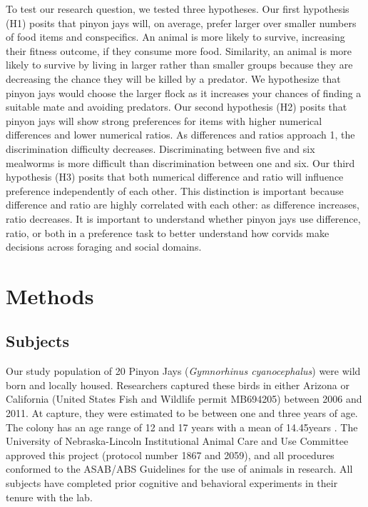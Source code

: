 \documentclass[
  ,doc,floatsintext]{apa6}
\begin{document}
To test our research question, we tested three hypotheses. Our first hypothesis (H1) posits that pinyon jays will, on average, prefer larger over smaller numbers of food items and conspecifics. An animal is more likely to survive, increasing their fitness outcome, if they consume more food. Similarity, an animal is more likely to survive by living in larger rather than smaller groups because they are decreasing the chance they will be killed by a predator. We hypothesize that pinyon jays would choose the larger flock as it increases your chances of finding a suitable mate and avoiding predators. Our second hypothesis (H2) posits that pinyon jays will show strong preferences for items with higher numerical differences and lower numerical ratios. As differences and ratios approach 1, the discrimination difficulty decreases. Discriminating between five and six mealworms is more difficult than discrimination between one and six. Our third hypothesis (H3) posits that both numerical difference and ratio will influence preference independently of each other. This distinction is important because difference and ratio are highly correlated with each other: as difference increases, ratio decreases. It is important to understand whether pinyon jays use difference, ratio, or both in a preference task to better understand how corvids make decisions across foraging and social domains.

\hypertarget{methods}{%
\section{Methods}\label{methods}}

\hypertarget{subjects}{%
\subsection{Subjects}\label{subjects}}

Our study population of 20 Pinyon Jays (\emph{Gymnorhinus cyanocephalus}) were wild born and locally housed. Researchers captured these birds in either Arizona or California (United States Fish and Wildlife permit MB694205) between 2006 and 2011. At capture, they were estimated to be between one and three years of age. The colony has an age range of 12 and 17 years with a mean of 14.45years . The University of Nebraska-Lincoln Institutional Animal Care and Use Committee approved this project (protocol number 1867 and 2059), and all procedures conformed to the ASAB/ABS Guidelines for the use of animals in research. All subjects have completed prior cognitive and behavioral experiments in their tenure with the lab.
\end{document}
